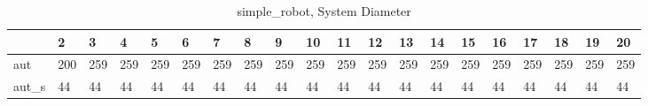 \begin{table}
\centering
\caption{simple_robot, System Diameter}
\label{simple_robot_diam}
\begin{tabular}{llllllllllllllllllll}
\toprule
{} &    2 &    3 &    4 &    5 &    6 &    7 &    8 &    9 &   10 &   11 &   12 &   13 &   14 &   15 &   16 &   17 &   18 &   19 &   20 \\
\midrule
aut   &  200 &  259 &  259 &  259 &  259 &  259 &  259 &  259 &  259 &  259 &  259 &  259 &  259 &  259 &  259 &  259 &  259 &  259 &  259 \\
aut\_s &   44 &   44 &   44 &   44 &   44 &   44 &   44 &   44 &   44 &   44 &   44 &   44 &   44 &   44 &   44 &   44 &   44 &   44 &   44 \\
\bottomrule
\end{tabular}
\end{table}
